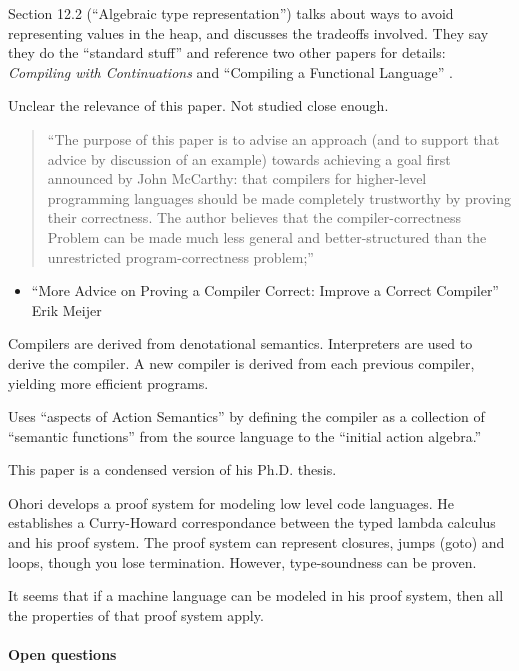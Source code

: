 \documentclass[11pt]{article}
\begin{document}
Section 12.2 (``Algebraic type representation'') talks about ways to
avoid representing values in the heap, and discusses the tradeoffs
involved. They say they do the ``standard stuff'' and reference two
other papers for details: \emph{Compiling with Continuations}
\citep{Appel92Compiling} and ``Compiling a Functional Language''
\citep{Cardelli84Compiling}.

\bigskip
{}
\bigskip

Unclear the relevance of this paper. Not studied close enough.

\begin{quote}
``The purpose of this paper is to advise an approach (and to support
that advice by discussion of an example) towards achieving a goal
first announced by John McCarthy: that compilers for higher-level
programming languages should be made completely trustworthy by proving
their correctness. The author believes that the compiler-correctness
Problem can be made much less general and better-structured than the
unrestricted program-correctness problem;''
\end{quote}

\begin{itemize}
\item ``More Advice on Proving a Compiler Correct: Improve a Correct Compiler''
Erik Meijer
\end{itemize}

Compilers are derived from denotational semantics. Interpreters are used to
derive the compiler. A new compiler is derived from each previous compiler, yielding
more efficient programs. 

Uses ``aspects of Action Semantics'' by defining the compiler as a collection of
``semantic functions'' from the source language to the ``initial action algebra.''

This paper is a condensed version of his Ph.D. thesis.


Ohori develops a proof system for modeling low level code
languages. He establishes a Curry-Howard correspondance between the
typed lambda calculus and his proof system. The proof system can represent
closures, jumps (goto) and loops, though you lose termination. However, type-soundness
can be proven. 

It seems that if a machine language can be modeled in his proof
system, then all the properties of that proof system apply.

\paragraph{Open questions}
\end{document}
